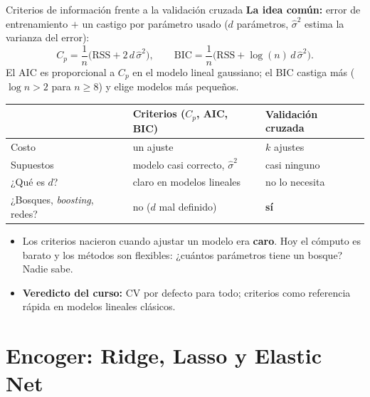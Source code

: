 \documentclass{beamer}
\newcommand{\1}{\mathbb{I}}
\newcommand{\RSS}{\mathrm{RSS}}
\begin{document}
\begin{frame}{Criterios de información frente a la validación cruzada}
\small
\textbf{La idea común:} error de entrenamiento $+$ un castigo por parámetro usado ($d$ parámetros, $\hat{\sigma}^2$ estima la varianza del error):
\[ C_p = \frac{1}{n}\big(\RSS + 2\,d\,\hat{\sigma}^2\big), \qquad \mathrm{BIC} = \frac{1}{n}\big(\RSS + \log(n)\,d\,\hat{\sigma}^2\big). \]
El AIC es proporcional a $C_p$ en el modelo lineal gaussiano; el BIC castiga más ($\log n > 2$ para $n \geq 8$) y elige modelos más pequeños.
\pause
\begin{center}
\scriptsize
\setlength{\tabcolsep}{4pt}
\begin{tabular}{lll}
\hline
 & Criterios ($C_p$, AIC, BIC) & Validación cruzada \\
\hline
Costo & un ajuste & $k$ ajustes \\
Supuestos & modelo casi correcto, $\hat{\sigma}^2$ & casi ninguno \\
¿Qué es $d$? & claro en modelos lineales & no lo necesita \\
¿Bosques, \emph{boosting}, redes? & no ($d$ mal definido) & \textbf{sí} \\
\hline
\end{tabular}
\end{center}
\pause
\begin{itemize}\itemsep3pt
  \item Los criterios nacieron cuando ajustar un modelo era \textbf{caro}. Hoy el cómputo es barato y los métodos son flexibles: ¿cuántos parámetros tiene un bosque? Nadie sabe.
  \item \textbf{Veredicto del curso:} CV por defecto para todo; criterios como referencia rápida en modelos lineales clásicos.
\end{itemize}
\end{frame}


\section{Encoger: Ridge, Lasso y Elastic Net}
\begin{frame}[noframenumbering]
\tableofcontents[currentsection]
\end{frame}
\end{document}
